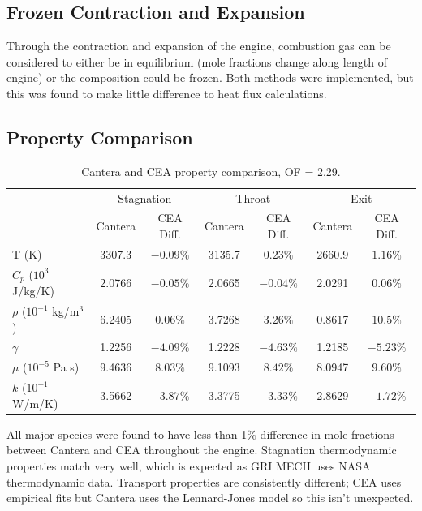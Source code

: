 \documentclass[11pt]{article}
\begin{document}
\subsection{Frozen Contraction and Expansion}

Through the contraction and expansion of the engine, combustion gas can be considered to either be in equilibrium (mole fractions change along length of engine) or the composition could be frozen. Both methods were implemented, but this was found to make little difference to heat flux calculations.


\subsection{Property Comparison}

\begin{table}[H]
  \centering
  \caption{Cantera and CEA property comparison, OF = 2.29.}
  \begin{tabular}{l c c c c c c}
    \toprule
    & \multicolumn{2}{c}{Stagnation} & \multicolumn{2}{c}{Throat} & \multicolumn{2}{c}{Exit} \\
    \cmidrule(lr){2-3} \cmidrule(lr){4-5} \cmidrule(lr){6-7}
    & Cantera & CEA Diff. & Cantera & CEA Diff. & Cantera & CEA Diff. \\
    \midrule
    T (K) & 3307.3 & $-0.09\%$ & 3135.7 & $0.23\%$ & 2660.9 & $1.16\%$ \\
    $C_p$ ($10^3$ J/kg/K) & 2.0766 & $-0.05\%$ & 2.0665 & $-0.04\%$ & 2.0291 & $0.06\%$ \\
    $\rho$ ($10^{-1}$ kg/m$^3$) & 6.2405 & $0.06\%$ & 3.7268 & $3.26\%$ & 0.8617 & $10.5\%$\\
    $\gamma$ & 1.2256 & $-4.09\%$ & 1.2228 & $-4.63\%$ & 1.2185 & $-5.23\%$ \\
    $\mu$ ($10^{-5}$ Pa s) & 9.4636 & $8.03\%$ & 9.1093 & $8.42\%$ & 8.0947 & $9.60\%$ \\
    $k$ ($10^{-1}$ W/m/K) & 3.5662 & $-3.87\%$ & 3.3775 & $-3.33\%$ & 2.8629 & $-1.72\%$\\
    \bottomrule
  \end{tabular}
\end{table}

All major species were found to have less than 1\% difference in mole fractions between Cantera and CEA throughout the engine. Stagnation thermodynamic properties match very well, which is expected as GRI MECH uses NASA thermodynamic data. Transport properties are consistently different; CEA uses empirical fits but Cantera uses the Lennard-Jones model so this isn't unexpected.
\end{document}
